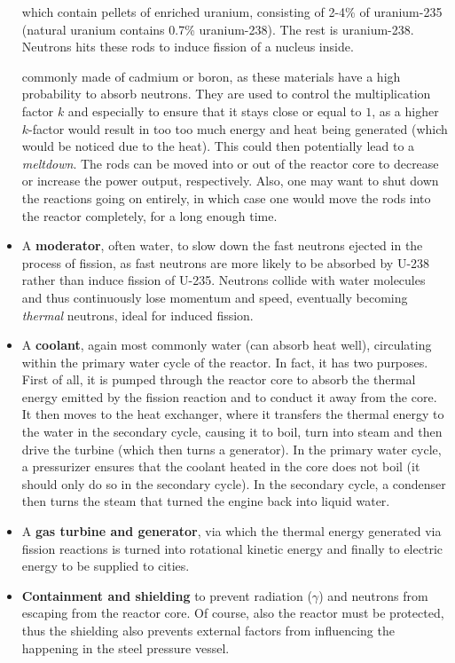 \begin{itemize}
	
	 which contain pellets of enriched uranium, consisting of 2-4\% of uranium-235 (natural uranium contains 0.7\% uranium-238). The rest is uranium-238. Neutrons hits these rods to induce fission of a nucleus inside.

	 commonly made of cadmium or boron, as these materials have a high probability to absorb neutrons. They are used to control the multiplication factor $k$ and especially to ensure that it stays close or equal to $1$, as a higher $k$-factor would result in too too much energy and heat being generated (which would be noticed due to the heat). This could then potentially lead to a \emph{meltdown}. The rods can be moved into or out of the reactor core to decrease or increase the power output, respectively. Also, one may want to shut down the reactions going on entirely, in which case one would move the rods into the reactor completely, for a long enough time.

	\item A \textbf{moderator}, often water, to slow down the fast neutrons ejected in the process of fission, as fast neutrons are more likely to be absorbed by U-238 rather than induce fission of U-235. Neutrons collide with water molecules and thus continuously lose momentum and speed, eventually becoming \emph{thermal} neutrons, ideal for induced fission.

	\item A \textbf{coolant}, again most commonly water (can absorb heat well), circulating within the primary water cycle of the reactor. In fact, it has two purposes. First of all, it is pumped through the reactor core to absorb the thermal energy emitted by the fission reaction and to conduct it away from the core. It then moves to the heat exchanger, where it transfers the thermal energy to the water in the secondary cycle, causing it to boil, turn into steam and then drive the turbine (which then turns a generator). In the primary water cycle, a pressurizer ensures that the coolant heated in the core does not boil (it should only do so in the secondary cycle). In the secondary cycle, a condenser then turns the steam that turned the engine back into liquid water.

	\item A \textbf{gas turbine and generator}, via which the thermal energy generated via fission reactions is turned into rotational kinetic energy and finally to electric energy to be supplied to cities.

	\item \textbf{Containment and shielding} to prevent radiation ($\gamma$) and neutrons from escaping from the reactor core. Of course, also the reactor must be protected, thus the shielding also prevents external factors from influencing the happening in the steel pressure vessel.

\end{itemize}

